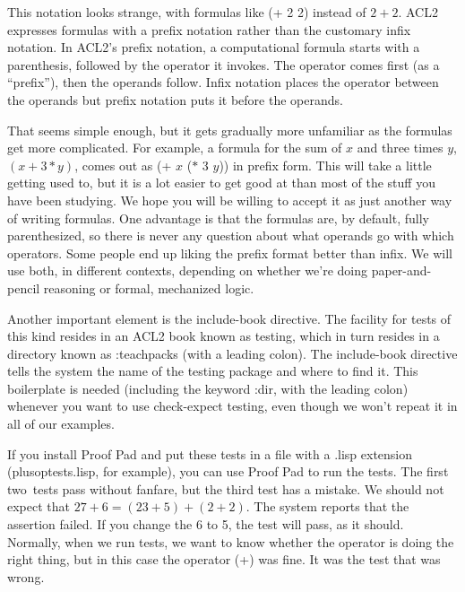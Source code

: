 This notation looks strange, with formulas like \textsf{(+ 2 2)} instead of $2 + 2$.
ACL2 expresses formulas with a
prefix notation
rather than the customary infix notation.
In ACL2's prefix notation, a computational
formula starts with a parenthesis,
followed by the operator it invokes.
The operator comes first (as a ``prefix''), then the operands follow.
Infix notation places the operator between the operands
but prefix notation puts it before the operands.

That seems simple enough, but it gets gradually more unfamiliar
as the formulas get more complicated.
For example, a formula for the sum of $x$ and three times $y$, $(x + 3*y)$,
comes out as \textsf{(+ $x$ ($*$ 3 $y$))} in prefix form.
This will take a little getting used to,
but it is a lot easier to get good at than
most of the stuff you have been studying.
We hope you will be willing to accept it as just another way of writing formulas.
One advantage is that the formulas are, by default, fully parenthesized,
so there is never any question about what operands go with which operators.
Some people end up liking the prefix format better than infix.
We will use both, in different contexts, depending on whether
we're doing paper-and-pencil reasoning or formal, mechanized logic.

Another important element is the
\textsf{include-book}
directive.
The facility for tests of this kind resides in an ACL2 book
known as \textsf{testing}, which in turn resides in a directory known
as
\textsf{:teachpacks} (with a leading colon).
The \textsf{include-book} directive tells the system
the name of the testing package and where to find it.
This boilerplate is needed (including the keyword \textsf{:dir}, with the leading colon)
whenever you want to use \textsf{check-expect} testing,
even though we won't repeat it in all of our examples. %

If you install Proof Pad and put these tests in a file
with a .lisp extension (plusoptests.lisp, for example),
you can use Proof Pad to run the tests.
The first two\ tests pass without fanfare,
but the third test has a mistake.
We should not expect that $27 + 6 = (23 + 5) + (2 + 2)$.
The system reports that the assertion failed.
If you change the 6 to 5, the test will pass, as it should.
Normally, when we run tests, we want to know whether the
operator is doing the right thing,
but in this case the operator (\textsf{+}) was fine.
It was the test that was wrong.

